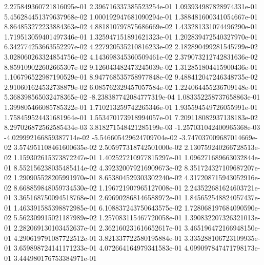 2.275849360721816095e-01	2.396716337385523254e-01	1.093934987828974331e-01	5.456284451379637968e-02	1.000192947681090294e-01	1.388481600341054667e-01	8.864853272233884363e-02	4.881810797875686669e-02	1.433281331074496290e-01	1.719513059401497346e-01	1.325947151891621323e-01	1.202839472540327970e-01	6.342774253663552297e-02	4.227920535210816233e-02	2.182890499281545799e-02	3.028060263324854756e-02	4.143698345360509461e-02	2.379073212742831636e-02	8.859109022602665307e-02	9.126043482473245039e-02	1.312851804415900436e-01	1.106796522987190529e-01	8.947768535758977848e-02	9.488412047246348735e-02	2.910601624532738879e-02	6.085762329457057584e-02	1.224064455236709148e-01	5.368398565032478365e-02	-8.238387742084777319e-04	1.083352258737658863e-01	1.399805466085785322e-01	1.710213259742265346e-01	1.935594549726055991e-01	1.758459524431681964e-01	1.553470173918994057e-01	7.209118082937138183e-02	8.297026872562585434e-03	3.818271548421285199e-03	-1.257031042400965368e-03	-4.029992166859387714e-02	-5.546605429624709704e-02	-3.747037009687014669e-02	3.574951108461600635e-02	2.505977318742501000e-02	2.130759240266728513e-02	1.159302615373872247e-01	1.402527210977815297e-01	1.096271689663032844e-01	8.552156238035485414e-02	4.392320079216909673e-02	8.351724327109687207e-02	1.290905528205991970e-01	8.653804529303302240e-02	4.317208715943052916e-02	8.668859848059734530e-02	1.196721907965127008e-01	2.243522681624603721e-01	3.365168750094518768e-01	2.696902868146588972e-01	1.845652548824057437e-01	1.463391585398872985e-01	6.108837243750643575e-02	1.728068197684090590e-02	5.562309915021187989e-02	1.257083115467720058e-01	1.390832207326321013e-01	2.282069130103452637e-01	2.362160231616652617e-01	3.465196472166948150e-01	4.290619791087722512e-01	3.821337722580195884e-01	3.335288106723109935e-01	3.659898724141171233e-01	4.072664164979341583e-01	4.099097847471798173e-01	3.444980176753384971e-01
